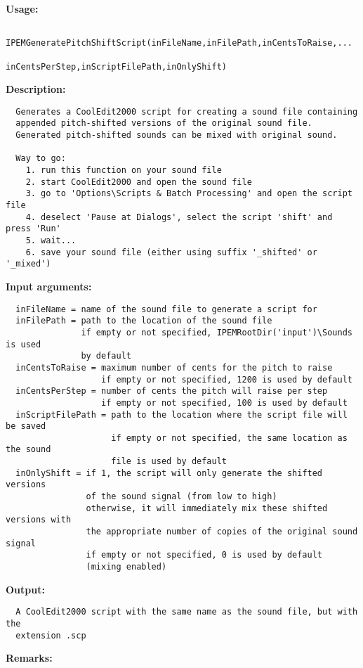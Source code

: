 \textbf{Usage:}
\begin{verbatim}  IPEMGeneratePitchShiftScript(inFileName,inFilePath,inCentsToRaise,...
                               inCentsPerStep,inScriptFilePath,inOnlyShift)

\end{verbatim}
\textbf{Description:}
\begin{verbatim}  Generates a CoolEdit2000 script for creating a sound file containing
  appended pitch-shifted versions of the original sound file.
  Generated pitch-shifted sounds can be mixed with original sound.

  Way to go:
    1. run this function on your sound file
    2. start CoolEdit2000 and open the sound file
    3. go to 'Options\Scripts & Batch Processing' and open the script file
    4. deselect 'Pause at Dialogs', select the script 'shift' and press 'Run'
    5. wait...
    6. save your sound file (either using suffix '_shifted' or '_mixed')

\end{verbatim}
\textbf{Input arguments:}
\begin{verbatim}  inFileName = name of the sound file to generate a script for
  inFilePath = path to the location of the sound file
               if empty or not specified, IPEMRootDir('input')\Sounds is used
               by default
  inCentsToRaise = maximum number of cents for the pitch to raise
                   if empty or not specified, 1200 is used by default
  inCentsPerStep = number of cents the pitch will raise per step
                   if empty or not specified, 100 is used by default
  inScriptFilePath = path to the location where the script file will be saved
                     if empty or not specified, the same location as the sound
                     file is used by default
  inOnlyShift = if 1, the script will only generate the shifted versions
                of the sound signal (from low to high)
                otherwise, it will immediately mix these shifted versions with
                the appropriate number of copies of the original sound signal
                if empty or not specified, 0 is used by default
                (mixing enabled)

\end{verbatim}
\textbf{Output:}
\begin{verbatim}  A CoolEdit2000 script with the same name as the sound file, but with the
  extension .scp

\end{verbatim}
\textbf{Remarks:}
